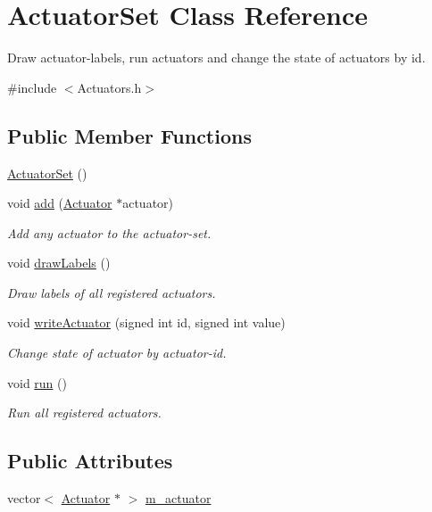 \hypertarget{classActuatorSet}{\section{Actuator\-Set Class Reference}
\label{classActuatorSet}
}


Draw actuator-\/labels, run actuators and change the state of actuators by id.  




{\ttfamily \#include $<$Actuators.\-h$>$}

\subsection*{Public Member Functions}
\begin{DoxyCompactItemize}
\item 
\hyperlink{classActuatorSet_ab755839440f598cbb8e0ac5a24b74c7d}{Actuator\-Set} ()
\item 
void \hyperlink{classActuatorSet_a5c2f8ee29cc0ab8ea165f24b0592ef65}{add} (\hyperlink{classActuator}{Actuator} $\ast$actuator)
\begin{DoxyCompactList}\small\item\em Add any actuator to the actuator-\/set. \end{DoxyCompactList}\item 
void \hyperlink{classActuatorSet_a55a037ecf2905802d6f89941fd73a61c}{draw\-Labels} ()
\begin{DoxyCompactList}\small\item\em Draw labels of all registered actuators. \end{DoxyCompactList}\item 
void \hyperlink{classActuatorSet_a61e2b64780d67b971cecd0f220e77af6}{write\-Actuator} (signed int id, signed int value)
\begin{DoxyCompactList}\small\item\em Change state of actuator by actuator-\/id. \end{DoxyCompactList}\item 
void \hyperlink{classActuatorSet_ab7f5bb6756d4a5f57dbb94e4f8abcf53}{run} ()
\begin{DoxyCompactList}\small\item\em Run all registered actuators. \end{DoxyCompactList}\end{DoxyCompactItemize}
\subsection*{Public Attributes}
\begin{DoxyCompactItemize}
\item 
vector$<$ \hyperlink{classActuator}{Actuator} $\ast$ $>$ \hyperlink{classActuatorSet_a2696ae7e9eeee0b062e85d68387d6d92}{m\-\_\-actuator}
\end{DoxyCompactItemize}


